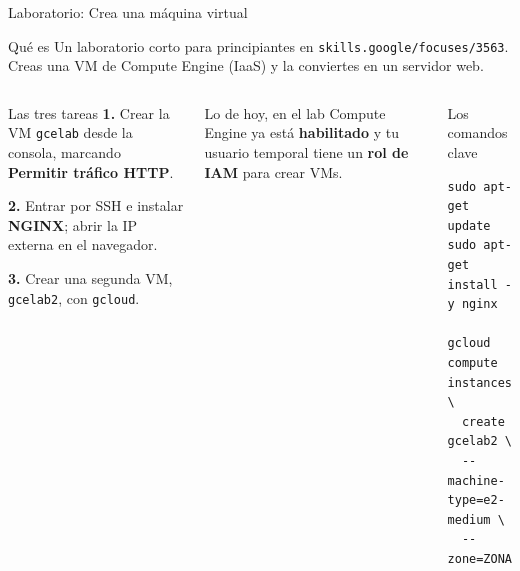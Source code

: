 \documentclass[aspectratio=169,10pt,c]{beamer}
\begin{document}
\begin{frame}[fragile]{Laboratorio: Crea una máquina virtual}
\begin{block}{Qué es}
\small Un laboratorio corto para principiantes en \texttt{skills.google/focuses/3563}. Creas una VM de Compute Engine (IaaS) y la conviertes en un servidor web.
\end{block}
\begin{columns}[T,onlytextwidth]
\begin{exampleblock}{Las tres tareas}
\small
\textbf{1.} Crear la VM \texttt{gcelab} desde la consola, marcando \textbf{Permitir tráfico HTTP}.\par\smallskip
\textbf{2.} Entrar por SSH e instalar \textbf{NGINX}; abrir la IP externa en el navegador.\par\smallskip
\textbf{3.} Crear una segunda VM, \texttt{gcelab2}, con \texttt{gcloud}.
\end{exampleblock}
\begin{alertblock}{Lo de hoy, en el lab}
\small Compute Engine ya está \textbf{habilitado} y tu usuario temporal tiene un \textbf{rol de IAM} para crear VMs.
\end{alertblock}
\begin{block}{Los comandos clave}
\begin{lstlisting}[basicstyle=\ttfamily\footnotesize]
sudo apt-get update
sudo apt-get install -y nginx

gcloud compute instances \
  create gcelab2 \
  --machine-type=e2-medium \
  --zone=ZONA
\end{lstlisting}
\end{block}
\end{columns}
\end{frame}
\end{document}
